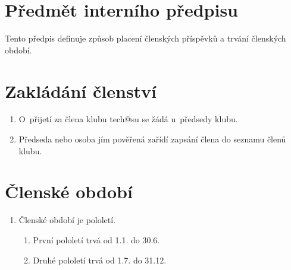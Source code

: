 \documentclass[10pt]{article}
\begin{document}
\section{Předmět interního předpisu}
	Tento předpis definuje způsob placení členských příspěvků a trvání členských období.

\section{Zakládání členství}
	\begin{enumerate}
		\item O~přijetí za člena klubu tech@su se žádá u~předsedy klubu.
		\item Předseda nebo osoba jím pověřená zařídí zapsání člena do seznamu členů klubu.
	\end{enumerate}
\section{Členské období}
	\begin{enumerate}
		\item Členské období je pololetí.
		\begin{enumerate}
			\item První pololetí trvá od 1.1. do 30.6.
			\item Druhé pololetí trvá od 1.7. do 31.12.
		\end{enumerate}
	\end{enumerate}
\end{document}
